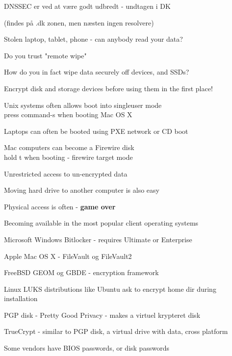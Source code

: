 \documentclass[Screen16to9,17pt]{foils}
\begin{document}
\vskip 2cm

\centerline{\Large DNSSEC er ved at være godt udbredt - undtagen i DK}
(findes på .dk zonen, men næsten ingen resolvere)




\begin{list1}
\item Stolen laptop, tablet, phone - can anybody read your data?
\item Do you trust "remote wipe"
\item How do you in fact wipe data securely off devices, and SSDs?
\item Encrypt disk and storage devices before using them in the first place!
\end{list1}


\begin{list1}
\item Unix systems often allows boot into singleuser mode\\
press command-s when booting Mac OS X
\item Laptops can often be booted using PXE network or CD boot
\item Mac computers can become a Firewire disk\\
hold t when booting - firewire target mode
\item Unrestricted access to un-encrypted data
\item Moving hard drive to another computer is also easy
\end{list1}
\pause
\centerline{Physical access is often - {\bf game over}}




\begin{list1}
\item Becoming available in the most popular client operating systems
\begin{list2}
\item Microsoft Windows Bitlocker - requires Ultimate or Enterprise
\item Apple Mac OS X - FileVault og FileVault2
\item FreeBSD GEOM og GBDE - encryption framework
\item Linux LUKS distributions like Ubuntu ask to encrypt home dir during installation
\item PGP disk - Pretty Good Privacy - makes a virtuel krypteret disk
\item TrueCrypt - similar to PGP disk, a virtual drive with data, cross platform
\item Some vendors have BIOS passwords, or disk passwords
\end{list2}
\end{list1}
\end{document}
